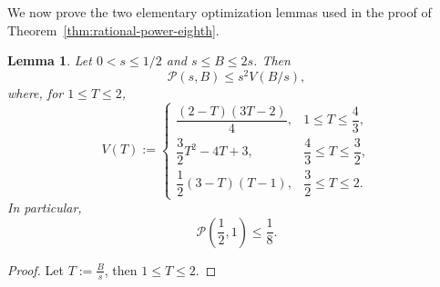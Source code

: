 \documentclass[runningheads,envcountsame,a4paper]{llncs}
\newtheorem{lem}[thm]{Lemma}
\begin{document}
We now prove the two elementary optimization lemmas used in the proof of
Theorem~\ref{thm:rational-power-eighth}.

\begin{lem}\label{lem:packing-function}
Let \(0<s\le 1/2\) and \(s\le B\le 2s\). Then
\[
\mathcal P(s,B)\le s^2V(B/s),
\]
where, for \(1\le T\le 2\),
\[
V(T):=
\begin{cases}
\dfrac{(2-T)(3T-2)}{4},
& 1\le T\le \dfrac43,\\[8pt]
\dfrac32T^2-4T+3,
& \dfrac43\le T\le \dfrac32,\\[8pt]
\dfrac12(3-T)(T-1),
& \dfrac32\le T\le 2.
\end{cases}
\]
In particular,
\[
\mathcal P\left(\frac12,1\right)\le \frac18.
\]
\end{lem}

\begin{proof}
Let $T:=\frac{B}{s}$, then \(1\le T\le 2\).


\end{proof}
\end{document}
